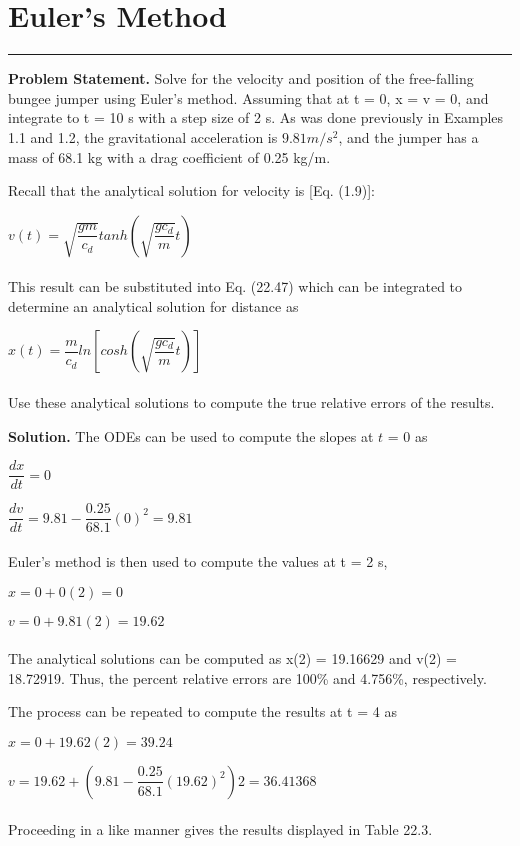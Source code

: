 \documentclass[../main.tex]{subfiles}
\begin{document}
\vspace{0,3in}
\section{Euler's Method}
\vspace{0,1in}
\hrule
\vspace{0,1in}
\textbf{Problem Statement.} Solve for the velocity and position of the free-falling bungee jumper
using Euler's method. Assuming that at t = 0, x = v = 0, and integrate to t = 10 s with a
step size of 2 s. As was done previously in Examples 1.1 and 1.2, the gravitational acceleration is $9.81 m/s^2$, and the jumper has a mass of 68.1 kg with a drag coefficient of 0.25 kg/m. 

Recall that the analytical solution for velocity is [Eq. (1.9)]:

$v(t) = \sqrt{\dfrac{gm}{c_{d}}} tanh \left( \sqrt{\dfrac{gc_d}{m}}t \right)$\\
\\
This result can be substituted into Eq. (22.47) which can be integrated to determine an
analytical solution for distance as

$x(t) = \dfrac{m}{c_d} ln \left[ cosh \left( \sqrt{\dfrac{gc_d}{m}}t \right) \right]$\\
\\
Use these analytical solutions to compute the true relative errors of the results.

\vspace{0.2in}
\textbf{Solution.} The ODEs can be used to compute the slopes at $t$ = 0 as

$\dfrac{dx}{dt} = 0$

$\dfrac{dv}{dt} = 9.81 - \dfrac{0.25}{68.1} (0)^2 = 9.81$\\
\\
Euler's method is then used to compute the values at t = 2 s,

$x = 0 + 0(2) = 0$

$v = 0 + 9.81(2) = 19.62$\\
\\
The analytical solutions can be computed as x(2) = 19.16629 and v(2) = 18.72919. Thus,
the percent relative errors are 100\% and 4.756\%, respectively.

The process can be repeated to compute the results at t = 4 as

$x = 0 + 19.62(2) = 39.24$

$v = 19.62 + \left( 9.81 − \dfrac{0.25}{68.1} (19.62)^2 \right)2 = 36.41368$\\
\\
Proceeding in a like manner gives the results displayed in Table 22.3.
\end{document}
